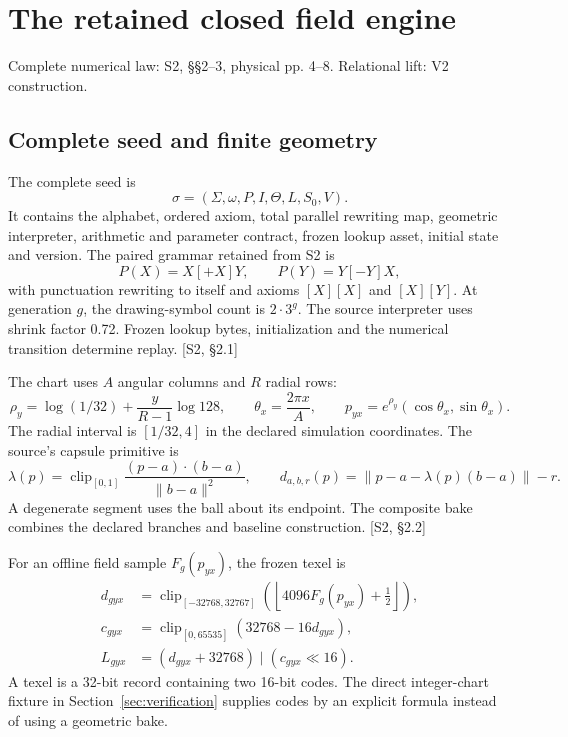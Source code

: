 \documentclass[11pt,a4paper]{article}
\numberwithin{equation}{section}
\newcommand{\newsec}[1]{\clearpage\section{#1}}
\newcommand{\src}[2]{{\sffamily\small\color{slate}[#1, #2]}}
\newcommand{\origin}[1]{{\sffamily\small\color{slate}#1}\par\vspace{3pt}}
\newcommand{\clip}{\operatorname{clip}}
\begin{document}
\newsec{The retained closed field engine}
\label{sec:engine}
\origin{Complete numerical law: S2, §§2--3, physical pp. 4--8. Relational lift: V2 construction.}

\subsection{Complete seed and finite geometry}
The complete seed is
\begin{equation}
\sigma=(\Sigma,\omega,P,I,\Theta,L,S_0,V).
\end{equation}
It contains the alphabet, ordered axiom, total parallel rewriting map, geometric interpreter, arithmetic and parameter contract, frozen lookup asset, initial state and version. The paired grammar retained from S2 is
\begin{equation}
P(X)=X[+X]Y,\qquad P(Y)=Y[-Y]X,
\end{equation}
with punctuation rewriting to itself and axioms $[X][X]$ and $[X][Y]$. At generation $g$, the drawing-symbol count is $2\cdot3^g$. The source interpreter uses shrink factor 0.72. Frozen lookup bytes, initialization and the numerical transition determine replay. \src{S2}{\S2.1}

The chart uses $A$ angular columns and $R$ radial rows:
\begin{equation}
\rho_y=\log(1/32)+\frac{y}{R-1}\log128,\qquad
\theta_x=\frac{2\pi x}{A},\qquad
p_{yx}=e^{\rho_y}(\cos\theta_x,\sin\theta_x).
\end{equation}
The radial interval is $[1/32,4]$ in the declared simulation coordinates. The source's capsule primitive is
\begin{equation}
\lambda(p)=\clip_{[0,1]}\frac{(p-a)\cdot(b-a)}{\|b-a\|^2},
\qquad d_{a,b,r}(p)=\|p-a-\lambda(p)(b-a)\|-r.
\end{equation}
A degenerate segment uses the ball about its endpoint. The composite bake combines the declared branches and baseline construction. \src{S2}{\S2.2}

For an offline field sample $F_g(p_{yx})$, the frozen texel is
\begin{align}
d_{gyx}&=\clip_{[-32768,32767]}
\left(\left\lfloor4096F_g(p_{yx})+\tfrac12\right\rfloor\right),\\
c_{gyx}&=\clip_{[0,65535]}(32768-16d_{gyx}),\\
L_{gyx}&=(d_{gyx}+32768)\mathbin{|}(c_{gyx}\ll16).
\end{align}
A texel is a 32-bit record containing two 16-bit codes. The direct integer-chart fixture in Section~\ref{sec:verification} supplies codes by an explicit formula instead of using a geometric bake.
\end{document}
